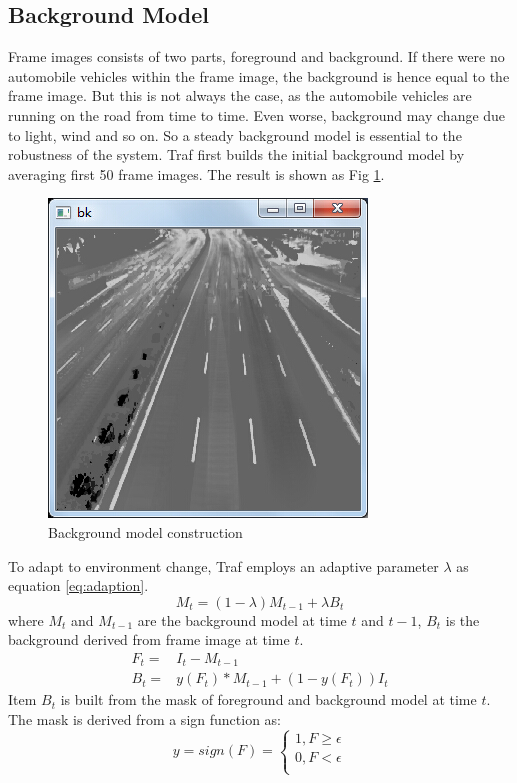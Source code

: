 \documentclass[conference]{IEEEtran}
\begin{document}
	\subsection{Background Model}
	Frame images consists of two parts, foreground and background. If there were no automobile vehicles within the frame image, the background is hence equal to the frame image. But this is not always the case, as the automobile vehicles are running on the road from time to time. Even worse, background may change due to light, wind and so on. So a steady background model is essential to the robustness of the system.
	Traf first builds the initial background model by averaging first 50 frame images. The result is shown as Fig \ref{fig:backgroundModel}.
	\begin{figure}[!h]
	\centering
	\includegraphics[width=0.6\linewidth]{figures/backGroundModel.jpg} 
	\caption{Background model construction}
	\label{fig:backgroundModel}
	\end{figure}
	 	
	To adapt to environment change, Traf employs an adaptive parameter $\lambda$ as equation \ref{eq:adaption}.
	\begin{equation}
	M_{t} = (1-\lambda)M_{t-1} + \lambda B_{t}
	\label{eq:adaption}
	\end{equation}
	where $M_t$ and $M_{t-1}$ are the background model at time $t$ and $t-1$, $B_{t}$ is the background derived from frame image at time $t$.
	\begin{eqnarray}	
	F_{t}=&I_{t} - M_{t-1}	\\
	B_{t}=&y(F_{t})*M_{t-1}+(1-y(F_{t}))I_{t}
	\end{eqnarray}
Item $B_{t}$ is built from the mask of foreground and background model at time $t$. The mask is derived from a sign function as:
	\begin{equation}
	  y=sign(F)=\left\{
	   \begin{aligned}
	   	1, F \geq \epsilon \\
	   	0, F < \epsilon \\
	   \end{aligned}
	   \right.
	\end{equation}			
	
\end{document}
